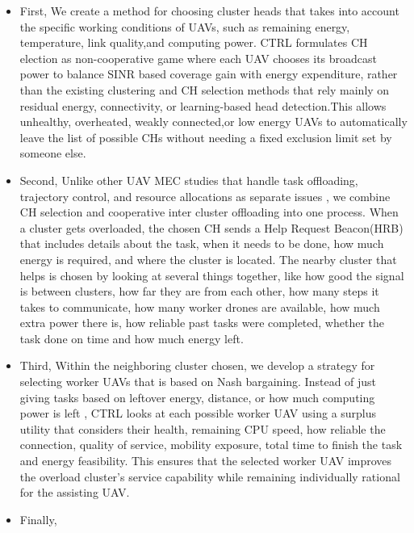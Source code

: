 \documentclass[journal]{IEEEtran}
\begin{document}
\begin{itemize}
\item {First,} We create a method for choosing cluster heads that takes into account the specific working conditions of UAVs, such as remaining energy, temperature, link quality,and computing power. CTRL formulates CH election as non-cooperative game where each UAV chooses its broadcast power to balance SINR based coverage gain with energy expenditure, rather than the existing clustering and CH selection methods that rely mainly on residual energy, connectivity, or learning-based head detection\cite{ref3,ref4}.This allows unhealthy, overheated, weakly connected,or low energy UAVs to automatically leave the list of possible CHs without needing a fixed exclusion limit set by someone else.

\item {Second,} Unlike other UAV MEC studies that handle task offloading, trajectory control, and resource allocations as separate issues \cite{ref1,ref2,ref16}, we combine CH selection and cooperative inter cluster offloading into one process. When a cluster gets overloaded, the chosen CH sends a Help Request Beacon(HRB) that includes details about the task, when it needs to be done, how much energy is required, and where the cluster is located. The nearby cluster that helps is chosen by looking at several things together, like how good the signal is between clusters, how far they are from each other, how many steps it takes to communicate, how many worker drones are available, how much extra power there is, how reliable past tasks were completed, whether the task done on time and how much energy left.

\item {Third,} Within the neighboring cluster chosen, we develop a strategy for selecting worker UAVs that is based on Nash bargaining. Instead of just giving tasks based on leftover energy, distance, or how much computing power is left \cite{ref1,ref2}, CTRL looks at each possible worker UAV using a surplus utility that considers their health, remaining CPU speed, how reliable the connection, quality of service, mobility exposure, total time to finish the task and energy feasibility. This ensures that the selected worker UAV improves the overload cluster's service capability while remaining individually rational for the assisting UAV.

\item {Finally,} 


\end{itemize}
\end{document}
